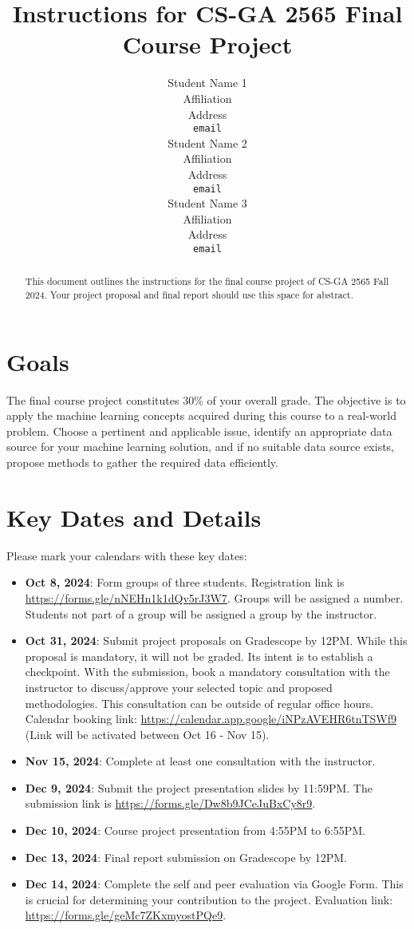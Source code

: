 \documentclass{article}
\title{Instructions for CS-GA 2565 Final Course Project}
\author{
  Student Name 1 \\
  Affiliation \\
  Address \\
  \texttt{email} \\
  \And
  Student Name 2 \\
  Affiliation \\
  Address \\
  \texttt{email} \\
  \And
  Student Name 3 \\
  Affiliation \\
  Address \\
  \texttt{email} \\
}
\begin{document}
\maketitle

\begin{abstract}
  This document outlines the instructions for the final course project of CS-GA 2565 Fall 2024. Your project proposal and final report should use this space for abstract.
\end{abstract}

\section{Goals}
The final course project constitutes 30\% of your overall grade. The objective is to apply the machine learning concepts acquired during this course to a real-world problem. Choose a pertinent and applicable issue, identify an appropriate data source for your machine learning solution, and if no suitable data source exists, propose methods to gather the required data efficiently.

\section{Key Dates and Details}
Please mark your calendars with these key dates:
\begin{itemize}
  \item \textbf{Oct 8, 2024}: Form groups of three students. Registration link is \url{https://forms.gle/nNEHn1k1dQv5rJ3W7}. Groups will be assigned a number. Students not part of a group will be assigned a group by the instructor.
  \item \textbf{Oct 31, 2024}: Submit project proposals on Gradescope by 12PM. While this proposal is mandatory, it will not be graded. Its intent is to establish a checkpoint. With the submission, book a mandatory consultation with the instructor to discuss/approve your selected topic and proposed methodologies. This consultation can be outside of regular office hours. Calendar booking link: \url{https://calendar.app.google/iNPzAVEHR6tnTSWf9} (Link will be activated between Oct 16 - Nov 15).
  \item \textbf{Nov 15, 2024}: Complete at least one consultation with the instructor.
  \item \textbf{Dec 9, 2024}: Submit the project presentation slides by 11:59PM. The submission link is \url{https://forms.gle/Dw8b9JCeJuBxCy8r9}.
  \item \textbf{Dec 10, 2024}: Course project presentation from 4:55PM to 6:55PM.
  \item \textbf{Dec 13, 2024}: Final report submission on Gradescope by 12PM.
  \item \textbf{Dec 14, 2024}: Complete the self and peer evaluation via Google Form. This is crucial for determining your contribution to the project. Evaluation link: \url{https://forms.gle/geMc7ZKxmyostPQe9}.
\end{itemize}
\end{document}
